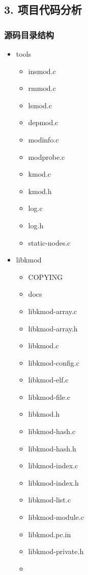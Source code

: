 \documentclass[11pt,a4paper]{article}
\begin{document}
\subsection{3. 项目代码分析}

\subsubsection{源码目录结构}

\begin{itemize}
\item
  tools
  \begin{itemize}
  \item
    insmod.c
  \item
    rmmod.c
  \item
    lsmod.c
  \item
    depmod.c
  \item
    modinfo.c
  \item
    modprobe.c
  \item
    kmod.c
  \item
    kmod.h
  \item
    log.c
  \item
    log.h
  \item
    static-nodes.c
  \end{itemize}
\item
  libkmod
  \begin{itemize}
  \item
    COPYING
  \item
    docs
  \item
    libkmod-array.c
  \item
    libkmod-array.h
  \item
    libkmod.c
  \item
    libkmod-config.c
  \item
    libkmod-elf.c
  \item
    libkmod-file.c
  \item
    libkmod.h
  \item
    libkmod-hash.c
  \item
    libkmod-hash.h
  \item
    libkmod-index.c
  \item
    libkmod-index.h
  \item
    libkmod-list.c
  \item
    libkmod-module.c
  \item
    libkmod.pc.in
  \item
    libkmod-private.h
  \item

\end{itemize}
\end{itemize}
\end{document}
